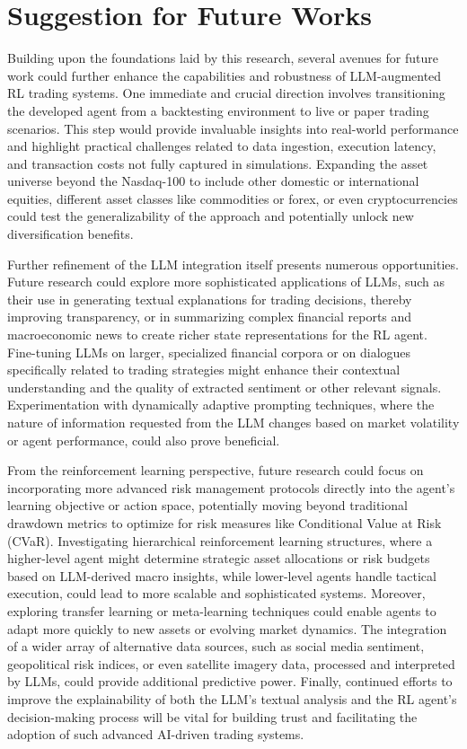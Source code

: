 \section{Suggestion for Future Works}
Building upon the foundations laid by this research, several avenues for future work could further enhance the capabilities and robustness of LLM-augmented RL trading systems. One immediate and crucial direction involves transitioning the developed agent from a backtesting environment to live or paper trading scenarios. This step would provide invaluable insights into real-world performance and highlight practical challenges related to data ingestion, execution latency, and transaction costs not fully captured in simulations. Expanding the asset universe beyond the Nasdaq-100 to include other domestic or international equities, different asset classes like commodities or forex, or even cryptocurrencies could test the generalizability of the approach and potentially unlock new diversification benefits.

Further refinement of the LLM integration itself presents numerous opportunities. Future research could explore more sophisticated applications of LLMs, such as their use in generating textual explanations for trading decisions, thereby improving transparency, or in summarizing complex financial reports and macroeconomic news to create richer state representations for the RL agent. Fine-tuning LLMs on larger, specialized financial corpora or on dialogues specifically related to trading strategies might enhance their contextual understanding and the quality of extracted sentiment or other relevant signals. Experimentation with dynamically adaptive prompting techniques, where the nature of information requested from the LLM changes based on market volatility or agent performance, could also prove beneficial.

From the reinforcement learning perspective, future research could focus on incorporating more advanced risk management protocols directly into the agent's learning objective or action space, potentially moving beyond traditional drawdown metrics to optimize for risk measures like Conditional Value at Risk (CVaR). Investigating hierarchical reinforcement learning structures, where a higher-level agent might determine strategic asset allocations or risk budgets based on LLM-derived macro insights, while lower-level agents handle tactical execution, could lead to more scalable and sophisticated systems. Moreover, exploring transfer learning or meta-learning techniques could enable agents to adapt more quickly to new assets or evolving market dynamics. The integration of a wider array of alternative data sources, such as social media sentiment, geopolitical risk indices, or even satellite imagery data, processed and interpreted by LLMs, could provide additional predictive power. Finally, continued efforts to improve the explainability of both the LLM's textual analysis and the RL agent's decision-making process will be vital for building trust and facilitating the adoption of such advanced AI-driven trading systems.
